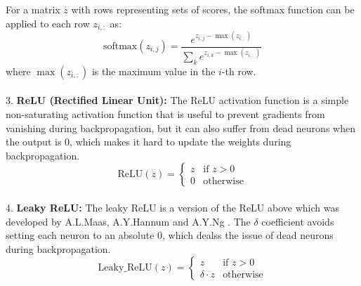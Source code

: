 For a matrix \( z \) with rows representing sets of scores, the softmax function can be applied to each row \( z_{i,:} \) as:
\[
\text{softmax}(z_{i,j}) = \frac{e^{z_{i,j} - \max(z_{i,:})}}{\sum_{k} e^{z_{i,k} - \max(z_{i,:})}}
\]
where \( \max(z_{i,:}) \) is the maximum value in the \( i \)-th row.
\\
\\
3. \textbf{ReLU (Rectified Linear Unit):}
The ReLU activation function is a simple non-saturating activation function that is useful to prevent gradients from vanishing during backpropagation, 
but it can also suffer from dead neurons when the output is 0, which makes it hard to update the weights during backpropagation.  
\[
\text{ReLU}(z) = 
\begin{cases} 
   z & \text{if } z > 0 \\
   0 & \text{otherwise}
\end{cases}
\]
\\
4. \textbf{Leaky ReLU:}
The leaky ReLU is a version of the ReLU above which was developed by A.L.Maas, A.Y.Hannum and A.Y.Ng \cite{relu_best_ever}. The $\delta$ coefficient avoids
setting each neuron to an absolute 0, which dealss the issue of dead neurons during backpropagation.
\[
\text{Leaky\_ReLU}(z) = 
\begin{cases} 
   z & \text{if } z > 0 \\
   \delta \cdot z & \text{otherwise}
\end{cases}
\]


